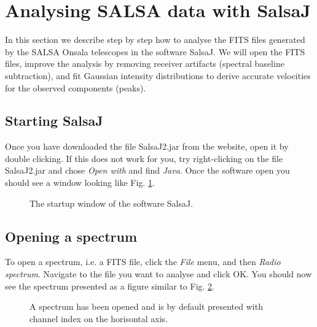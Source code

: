 \documentclass[11pt,a4paper]{article}
\begin{document}
\section{Analysing SALSA data with SalsaJ}
\label{sec:salsaj}
In this section we describe step by step how to analyse the FITS files
generated by the SALSA Onsala telescopes in the software SalsaJ. We will
open the FITS files, improve the analysis by removing receiver artifacts 
(spectral baseline subtraction), and fit Gaussian intensity distributions
to derive accurate velocities for the observed components (peaks).

\subsection{Starting SalsaJ}
Once you have downloaded the file SalsaJ2.jar from the website, 
open it by double clicking. If this does not work for you, 
try right-clicking on the file SalsaJ2.jar and chose \emph{Open with}
and find \emph{Java}. Once the software open you should see a window looking
like Fig. \ref{fig:salsajstart}.
\begin{figure}[h!]
  \centering
  \caption{The startup window of the software SalsaJ.}
  \label{fig:salsajstart}
\end{figure}

\subsection{Opening a spectrum}
To open a spectrum, i.e. a FITS file, click the \emph{File} menu, and then
\emph{Radio spectrum}. Navigate to the file you want to analyse and click OK.
You should now see the spectrum presented as a figure similar to Fig. 
\ref{fig:opened}.
\begin{figure}[h!]
  \centering
  \caption{A spectrum has been opened and is by default presented with channel
  index on the horisontal axis.}
  \label{fig:opened}
\end{figure}
\end{document}
